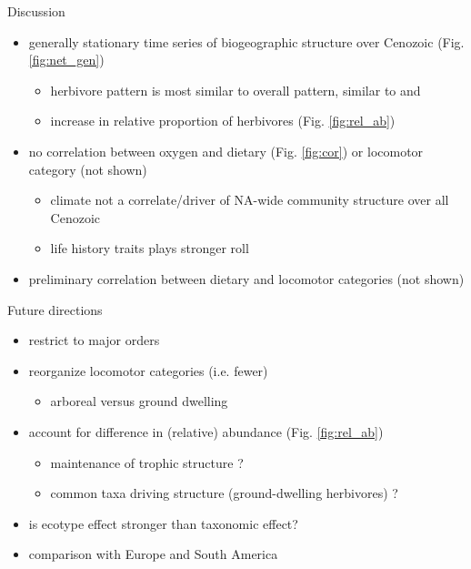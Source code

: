 \documentclass[final]{beamer}\usepackage[]{graphicx}\usepackage[]{color}
\newlength{\onecolwid}
\begin{document}
\begin{frame}[t]
\begin{columns}[t]
    \begin{columns}[t,totalwidth = \onecolwid]
      \begin{column}{\onecolwid}
        \begin{block}{Discussion}
          \begin{itemize}
            \item generally stationary time series of biogeographic structure over Cenozoic (Fig. \ref{fig:net_gen})
            \begin{itemize}
              \item herbivore pattern is most similar to overall pattern, similar to \citet{Jernvall2002} and \citet{Jernvall2004}
              \item increase in relative proportion of herbivores (Fig. \ref{fig:rel_ab})
            \end{itemize}
            \item no correlation between oxygen and dietary (Fig. \ref{fig:cor}) or locomotor category (not shown)
              \begin{itemize}
                \item climate not a correlate/driver of NA-wide community structure over all Cenozoic
                \item life history traits plays stronger roll
              \end{itemize}
            \item preliminary correlation between dietary and locomotor categories (not shown)
          \end{itemize}
        \end{block}

        \begin{block}{Future directions}
          \begin{itemize}
            \item restrict to major orders \citep{Jernvall2004}
            \item reorganize locomotor categories (i.e. fewer)
            \begin{itemize}
              \item arboreal versus ground dwelling
            \end{itemize}
            \item account for difference in (relative) abundance (Fig. \ref{fig:rel_ab})
            \begin{itemize}
              \item maintenance of trophic structure \citep{Jernvall2004}?
              \item common taxa driving structure (ground-dwelling herbivores) \citep{Jernvall2002}?
            \end{itemize}
            \item is ecotype effect stronger than taxonomic effect?
            \item comparison with Europe and South America
          \end{itemize}
        \end{block}



\end{column}
\end{columns}
\end{columns}
\end{frame}
\end{document}
